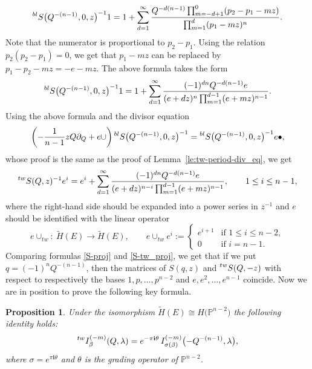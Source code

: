\documentclass[pdftex]{sigma}
\numberwithin{equation}{section}
\newtheorem{Proposition}[Theorem]{Proposition}
\newcommand{\leftexp}[2]{{\vphantom{#2}}^{#1}{#2}}
\newcommand{\PP}{\mathbb{P}}
\newcommand{\ii}{\mathbf{i}}
\begin{document}
\begin{equation}\label{blS}
\leftexp{bl}{S}\big(Q^{-(n-1)},0,z\big)^{-1} 1 = 1+
\sum_{d=1}^\infty
\frac{Q^{-d(n-1)} \prod_{m=-d+1}^0 (p_2-p_1 -mz) }{
\prod_{m=1}^{d} (p_1-mz)^n }.
\end{equation}
Note that the numerator is proportional to $p_2-p_1$. Using the
relation $p_2(p_2-p_1)=0$, we get that $p_1-mz$ can be replaced by
$p_1-p_2-mz= -e-mz$. The above formula takes the form
\begin{equation}\label{blS2}
\leftexp{bl}{S}\big(Q^{-(n-1)},0,z\big)^{-1} 1 = 1+
\sum_{d=1}^\infty
\frac{(-1)^{dn} Q^{-d(n-1)} e }{
(e+dz)^n\prod_{m=1}^{d-1} (e+mz)^{n-1} }.
\end{equation}
Using the above formula and the divisor equation
\[
\left( -\frac{1}{n-1} zQ\partial_Q+ e\cup\right)
\leftexp{bl}{S}\big(Q^{-(n-1)},0,z\big)^{-1} =
\leftexp{bl}{S}\big(Q^{-(n-1)},0,z\big)^{-1} e\bullet,
\]
whose proof is the same as the proof of Lemma~\ref{le:tw-period-div_eq}, we get
\begin{equation}\label{S-tw_proj}
\leftexp{tw}{S}(Q,z)^{-1} e^i =
e^i +
\sum_{d=1}^\infty
\frac{(-1)^{dn} Q^{-d(n-1)} e }{
(e+dz)^{n-i}\prod_{m=1}^{d-1} (e+mz)^{n-1} },\qquad 1\leq i\leq n-1,
\end{equation}
where the right-hand side should be expanded into a power series in $z^{-1}$ and
$e$ should be identified with the linear operator
\[
e\cup_{tw}\colon\ \widetilde{H}(E)\to \widetilde{H}(E),\qquad
e\cup_{tw} e^i :=
\begin{cases}
e^{i+1} & \mbox{if } 1\leq i\leq n-2,\\
0 & \mbox{if } i=n-1.
\end{cases}
\]
Comparing formulas \eqref{S-proj} and \eqref{S-tw_proj}, we get that
if we put $q=(-1)^n Q^{-(n-1)}$, then the matrices of $S(q,z)$ and
$\leftexp{tw}{S}(Q,-z)$ with respect to respectively the bases
$1,p,\dots,p^{n-2}$ and $e,e^2,\dots,e^{n-1}$ coincide. Now we are in
position to prove the following key formula.
\begin{Proposition}\label{prop:tw=proj}
Under the isomorphism
$\widetilde{H}(E)\cong H\big(\PP^{n-2}\big)$ the following identity holds:
\[%
\leftexp{tw}{I}^{(-m)}_\beta(Q,\lambda) =
e^{-\pi\ii\theta}\,
I^{(-m)}_{\sigma(\beta)}\bigl(-Q^{-(n-1)},\lambda\bigr),
\]
where $\sigma=e^{\pi\ii\theta}$ and $\theta$ is the grading operator
of $\PP^{n-2}$.
\end{Proposition}
\end{document}
